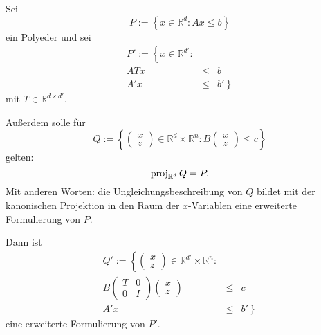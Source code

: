 \documentclass[10p,a4paper,BCOR = 12mm, DIV=15]{scrbook}
\begin{document}
\begin{Sa}
\label{sa:grundlage_arboreszenz_erw}
Sei
\begin{displaymath}
P := \left\{x \in \mathbb{R}^d: A x \leq b\right\} 
\end{displaymath}
ein Polyeder und sei
\begin{eqnarray*}
P' := \left\{x \in \mathbb{R}^{d'}: \right. & & \\
A T x & \leq & b \\
A' x & \leq & \left. b' \right\} 
\end{eqnarray*}
mit $T \in \mathbb{R}^{d \times d'}$.

Außerdem solle für
\begin{displaymath}
Q := \left\{\left(\begin{array}{c}
x \\
z
\end{array}\right) \in \mathbb{R}^d \times \mathbb{R}^n : B \left(\begin{array}{c}
x \\
z
\end{array}\right) \leq c\right\} 
\end{displaymath}
gelten:
\begin{displaymath}
\operatorname{proj}_{\mathbb{R}^d} Q = P.
\end{displaymath}
Mit anderen Worten: die Ungleichungsbeschreibung von $Q$ bildet mit der kanonischen Projektion in den Raum der $x$-Variablen eine erweiterte Formulierung von $P$.

Dann ist
\begin{eqnarray*}
Q' := \left\{\left(\begin{array}{c}
x \\
z
\end{array}\right) \in \mathbb{R}^{d'} \times \mathbb{R}^{n}: \right. & & \\
B \left(\begin{array}{cc}
T & 0 \\
0 & I
\end{array}\right) \left(\begin{array}{c}
x \\
z
\end{array}\right) & \leq & c \\
A' x & \leq & \left. b' \right\} 
\end{eqnarray*}
eine erweiterte Formulierung von $P'$.
\end{Sa}
\end{document}
